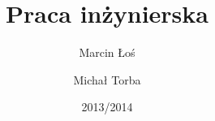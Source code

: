 
\title{Praca inżynierska}
\author{
  Marcin Łoś
  \and
  Michał Torba
}
\date{2013/2014}
\maketitle 
